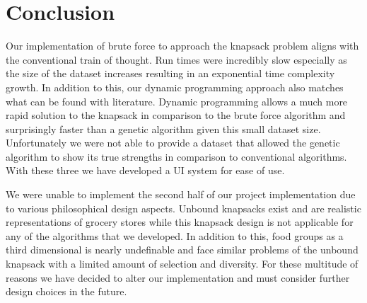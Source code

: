 \documentclass[10pt,journal,compsoc]{IEEEtran}
\begin{document}
\section{Conclusion}
Our implementation of brute force to approach the knapsack problem aligns with
the conventional train of thought. Run times were incredibly slow especially as
the size of the dataset increases resulting in an exponential time complexity
growth. In addition to this, our dynamic programming approach also matches what
can be found with literature. Dynamic programming allows a much more rapid
solution to the knapsack in comparison to the brute force algorithm and
surprisingly faster than a genetic algorithm given this small dataset size.
Unfortunately we were not able to provide a dataset that allowed the genetic
algorithm to show its true strengths in comparison to conventional algorithms.
With these three we have developed a UI system for ease of use.

We were unable to implement the second half of our project implementation due to
various philosophical design aspects. Unbound knapsacks exist and are realistic
representations of grocery stores while this knapsack design is not applicable
for any of the algorithms that we developed. In addition to this, food groups as
a third dimensional is nearly undefinable and face similar problems of the
unbound knapsack with a limited amount of selection and diversity. For these
multitude of reasons we have decided to alter our implementation and must
consider further design choices in the future. 



%
\end{document}
